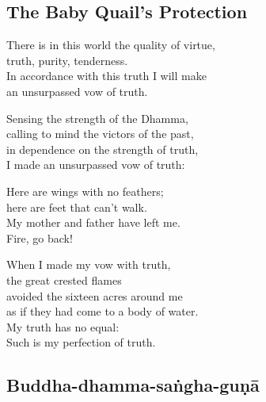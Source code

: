 \subsection{The Baby Quail's Protection}

There is in this world the quality of virtue,\\
truth, purity, tenderness.\\
In accordance with this truth I will make\\
an unsurpassed vow of truth.

Sensing the strength of the Dhamma,\\
calling to mind the victors of the past,\\
in dependence on the strength of truth,\\
I made an unsurpassed vow of truth:

Here are wings with no feathers;\\
here are feet that can't walk.\\
My mother and father have left me.\\
Fire, go back!

When I made my vow with truth,\\
the great crested flames\\
avoided the sixteen acres around me\\
as if they had come to a body of water.\\
My truth has no equal:\\
Such is my perfection of truth.

\subsection{Buddha-dhamma-saṅgha-guṇā}
\label{iti-pi-so}


